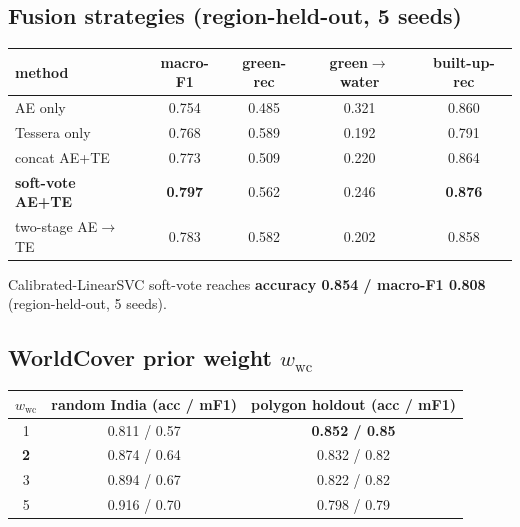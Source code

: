 \documentclass[11pt]{article}
\begin{document}
\subsection*{Fusion strategies (region-held-out, 5 seeds)}
\begin{table}[h]
\centering
\begin{tabular}{l c c c c}
\toprule
\textbf{method} & \textbf{macro-F1} & \textbf{green-rec} & \textbf{green$\rightarrow$water} & \textbf{built-up-rec} \\
\midrule
AE only            & 0.754 & 0.485 & 0.321 & 0.860 \\
Tessera only       & 0.768 & 0.589 & 0.192 & 0.791 \\
concat AE+TE       & 0.773 & 0.509 & 0.220 & 0.864 \\
\textbf{soft-vote AE+TE} & \textbf{0.797} & 0.562 & 0.246 & \textbf{0.876} \\
two-stage AE$\rightarrow$TE & 0.783 & 0.582 & 0.202 & 0.858 \\
\bottomrule
\end{tabular}
\end{table}
Calibrated-LinearSVC soft-vote reaches \textbf{accuracy 0.854 / macro-F1 0.808}
(region-held-out, 5 seeds).

\subsection*{WorldCover prior weight $w_{\text{wc}}$}
\begin{table}[h]
\centering
\begin{tabular}{c c c}
\toprule
$w_{\text{wc}}$ & \textbf{random India (acc / mF1)} & \textbf{polygon holdout (acc / mF1)} \\
\midrule
1 & 0.811 / 0.57 & \textbf{0.852 / 0.85} \\
\textbf{2} & 0.874 / 0.64 & 0.832 / 0.82 \\
3 & 0.894 / 0.67 & 0.822 / 0.82 \\
5 & 0.916 / 0.70 & 0.798 / 0.79 \\
\bottomrule
\end{tabular}
\end{table}
\end{document}
